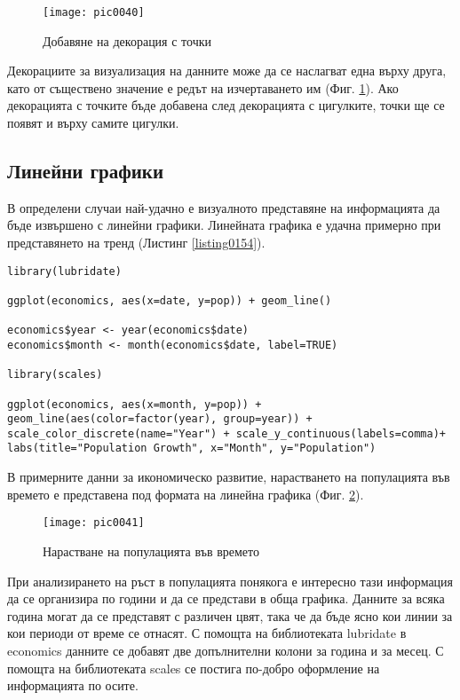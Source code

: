 \begin{figure}[h!]
  \centering
  \texttt{[image: pic0040]}
  \caption{Добавяне на декорация с точки}
\label{figure0040}
\end{figure}
\FloatBarrier

Декорациите за визуализация на данните може да се наслагват една върху друга, като от съществено значение е редът на изчертаването им (Фиг. \ref{figure0040}). Ако декорацията с точките бъде добавена след декорацията с цигулките, точки ще се появят и върху самите цигулки. 

\subsection{Линейни графики}

В определени случаи най-удачно е визуалното представяне на информацията да бъде извършено с линейни графики. Линейната графика е удачна примерно при представянето на тренд (Листинг \ref{listing0154}).

\begin{lstlisting}[caption=Линейни графики, label=listing0154]
library(lubridate)

ggplot(economics, aes(x=date, y=pop)) + geom_line()

economics$year <- year(economics$date)
economics$month <- month(economics$date, label=TRUE)

library(scales)

ggplot(economics, aes(x=month, y=pop)) + geom_line(aes(color=factor(year), group=year)) + scale_color_discrete(name="Year") + scale_y_continuous(labels=comma)+ labs(title="Population Growth", x="Month", y="Population")
\end{lstlisting}

В примерните данни за икономическо развитие, нарастването на популацията във времето е представена под формата на линейна графика (Фиг. \ref{figure0041}).

\begin{figure}[h!]
  \centering
  \texttt{[image: pic0041]}
  \caption{Нарастване на популацията във времето}
\label{figure0041}
\end{figure}
\FloatBarrier

При анализирането на ръст в популацията понякога е интересно тази информация да се организира по години и да се представи в обща графика. Данните за всяка година могат да се представят с различен цвят, така че да бъде ясно кои линии за кои периоди от време се отнасят. С помощта на библиотеката lubridate в economics данните се добавят две допълнителни колони за година и за месец. С помощта на библиотеката scales се постига по-добро оформление на информацията по осите. 

